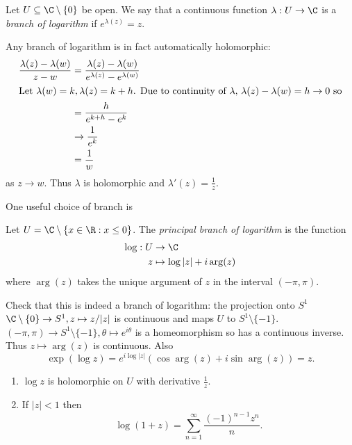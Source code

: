 \documentclass[a4paper]{article}
\begin{document}
\begin{definition}
  Let \(U \subseteq \C\setminus \{0\}\) be open. We say that a continuous function \(\lambda: U \to \C\) is a \emph{branch of logarithm} if \(e^{\lambda(z)} = z\).
\end{definition}

\begin{remark}
  Any branch of logarithm is in fact automatically holomorphic:
  \begin{align*}
    \frac{\lambda(z) - \lambda(w)}{z - w}
    &= \frac{\lambda(z) - \lambda(w)}{e^{\lambda(z)} - e^{\lambda(w)}} \\
    \intertext{Let \(\lambda(w) = k, \lambda(z) = k + h\). Due to continuity of \(\lambda\), \(\lambda(z) - \lambda(w) = h \to 0\) so}
    &= \frac{h}{e^{k + h} - e^k} \\
    &\to \frac{1}{e^k} \\
    &= \frac{1}{w}
  \end{align*}
  as \(z \to w\). Thus \(\lambda\) is holomorphic and \(\lambda'(z) = \frac{1}{z}\).

\end{remark}

One useful choice of branch is
\begin{definition}
  Let \(U = \C \setminus \{x \in \R: x\leq 0\}\). The \emph{principal branch of logarithm} is the function
  \begin{align*}
    \log: U &\to \C \\
    z &\mapsto \log |z| + i \arg(z)
  \end{align*}
  where \(\arg(z)\) takes the unique argument of \(z\) in the interval \((-\pi, \pi)\).
\end{definition}

Check that this is indeed a branch of logarithm: the projection onto \(S^1\) \(\C \setminus \{0\} \to S^1, z \mapsto z/|z|\) is continuous and maps \(U\) to \(S^1 \setminus \{-1\}\). \((-\pi, \pi) \to S^1 \setminus \{-1\}, \theta \mapsto e^{i\theta}\) is a homeomorphism so has a continuous inverse. Thus \(z \mapsto \arg(z)\) is continuous. Also
\[
  \exp(\log z) = e^{i \log |z|}(\cos \arg(z) + i \sin \arg(z)) = z.
\]

\begin{proposition}\leavevmode
  \begin{enumerate}
  \item \(\log z\) is holomorphic on \(U\) with derivative \(\frac{1}{z}\).
  \item If \(|z| < 1\) then
    \[
      \log(1 + z) = \sum_{n = 1}^\infty \frac{(-1)^{n - 1}z^n}{n}.
    \]
  \end{enumerate}
\end{proposition}
\end{document}
